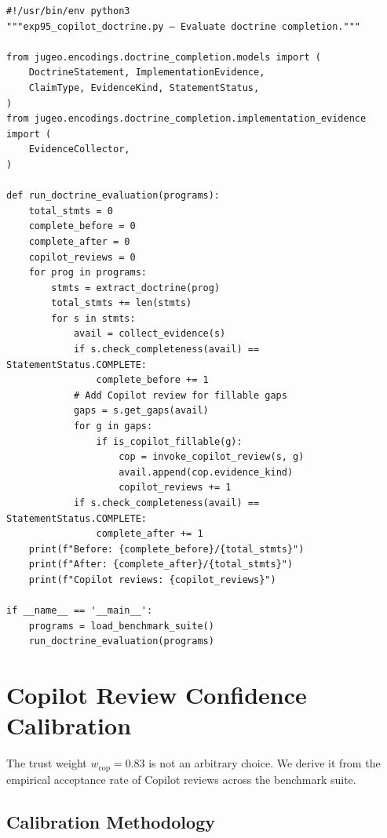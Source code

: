 \documentclass[11pt]{article}
\newcommand{\copweight}{w_{\mathrm{cop}}}
\begin{document}
\begin{lstlisting}[style=jugeo-python]
#!/usr/bin/env python3
"""exp95_copilot_doctrine.py — Evaluate doctrine completion."""

from jugeo.encodings.doctrine_completion.models import (
    DoctrineStatement, ImplementationEvidence,
    ClaimType, EvidenceKind, StatementStatus,
)
from jugeo.encodings.doctrine_completion.implementation_evidence import (
    EvidenceCollector,
)

def run_doctrine_evaluation(programs):
    total_stmts = 0
    complete_before = 0
    complete_after = 0
    copilot_reviews = 0
    for prog in programs:
        stmts = extract_doctrine(prog)
        total_stmts += len(stmts)
        for s in stmts:
            avail = collect_evidence(s)
            if s.check_completeness(avail) == StatementStatus.COMPLETE:
                complete_before += 1
            # Add Copilot review for fillable gaps
            gaps = s.get_gaps(avail)
            for g in gaps:
                if is_copilot_fillable(g):
                    cop = invoke_copilot_review(s, g)
                    avail.append(cop.evidence_kind)
                    copilot_reviews += 1
            if s.check_completeness(avail) == StatementStatus.COMPLETE:
                complete_after += 1
    print(f"Before: {complete_before}/{total_stmts}")
    print(f"After: {complete_after}/{total_stmts}")
    print(f"Copilot reviews: {copilot_reviews}")

if __name__ == '__main__':
    programs = load_benchmark_suite()
    run_doctrine_evaluation(programs)
\end{lstlisting}



\section{Copilot Review Confidence Calibration}\label{sec:calibration}

The trust weight $\copweight = 0.83$ is not an arbitrary choice.  We derive it
from the empirical acceptance rate of Copilot reviews across the benchmark
suite.

\subsection{Calibration Methodology}
\end{document}
